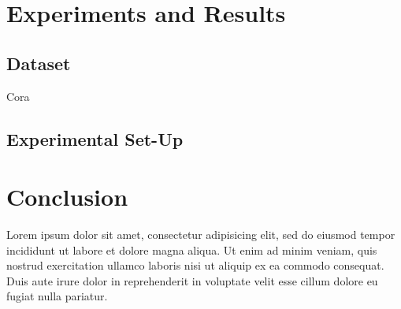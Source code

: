 \documentclass{report}
\begin{document}
\section{Experiments and Results}

\subsection{Dataset}
Cora
\subsection{Experimental Set-Up}

\section{Conclusion}

Lorem ipsum dolor sit amet, consectetur adipisicing elit, sed do eiusmod tempor
incididunt ut labore et dolore magna aliqua. Ut enim ad minim veniam, quis
nostrud exercitation ullamco laboris nisi ut aliquip ex ea commodo consequat.
Duis aute irure dolor in reprehenderit in voluptate velit esse cillum dolore eu
fugiat nulla pariatur.




\end{document}
